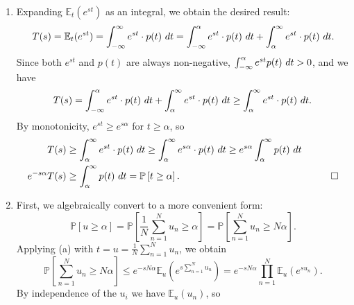 \documentclass{amsart}
\begin{document}
\begin{solution}\ 
  \begin{enumerate}
    \item Expanding \(\mathbb{E}_t(e^{st})\) as an integral, we obtain the
      desired result:
      \begin{equation*}
        T(s) = \mathbb{E}_t(e^{st}) = \int_{-\infty}^{\infty} e^{st} \cdot
          p(t) \textup{ } dt
          = \int_{-\infty}^{\alpha} e^{st} \cdot p(t) \textup{ } dt +
          \int_{\alpha}^{\infty} e^{st} \cdot p(t) \textup{ } dt.
      \end{equation*}
      Since both \(e^{st}\) and \(p(t)\) are always non-negative,
      \(\int_{-\infty}^{\alpha} e^{st} p(t) \textup{ } dt > 0\), and we have
      \begin{equation*}
        T(s) = \int_{-\infty}^{\alpha} e^{st} \cdot p(t) \textup{ } dt +
          \int_{\alpha}^{\infty} e^{st} \cdot p(t) \textup{ } dt
        \geq \int_{\alpha}^{\infty} e^{st} \cdot p(t) \textup{ } dt.
      \end{equation*}
      By monotonicity, \(e^{st} \geq e^{s\alpha}\) for \(t \geq \alpha\), so
      \begin{align*}
        T(s) &\geq \int_{\alpha}^{\infty} e^{st} \cdot p(t) \textup{ } dt
        \geq \int_{\alpha}^{\infty} e^{s\alpha} \cdot p(t) \textup{ } dt
        \geq e^{s\alpha} \int_{\alpha}^{\infty} p(t) \textup{ } dt & & \\
        e^{-s\alpha}T(s) &\geq \int_{\alpha}^{\infty} p(t) \textup{ } dt
          = \mathbb{P}\left[t \geq \alpha\right]. & &\qed
      \end{align*}
    \item First, we algebraically convert to a more convenient form:
      \begin{equation*}
        \mathbb{P}\left[u \geq \alpha\right] =
          \mathbb{P}\left[\frac{1}{N}\sum_{n=1}^Nu_n \geq \alpha\right]
          = \mathbb{P}\left[\sum_{n=1}^Nu_n \geq N \alpha\right].
      \end{equation*}
      Applying (a) with \(t = u = \frac{1}{N}\sum_{n=1}^N u_n\), we obtain
      \begin{equation*}
        \mathbb{P}\left[\sum_{n=1}^Nu_n \geq N \alpha\right] \leq
          e^{-sN\alpha} \mathbb{E}_u\left(e^{s\sum_{n=1}^Nu_n}\right)
          = e^{-sN\alpha} \prod_{n=1}^N \mathbb{E}_u\left(e^{su_n}\right).
      \end{equation*}
      By independence of the \(u_i\) we have \(\mathbb{E}_u(u_n)\), so
      \begin{equation*}

\end{equation*}
\end{enumerate}
\end{solution}
\end{document}
